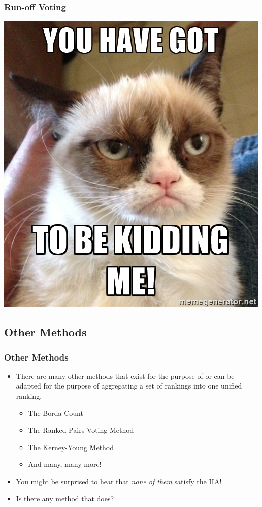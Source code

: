 \documentclass{beamer}
\begin{document}
    \begin{frame}
        \frametitle{Run-off Voting}
    
        \begin{center}
            \includegraphics[width=0.4\linewidth]{got_to_be_kidding_me.jpg}
        \end{center}
    
    \end{frame}
    
    \subsection{Other Methods}
    \begin{frame}
        \frametitle{Other Methods}
    
        \begin{itemize}
            \item There are many other methods that exist for the purpose of or can be adapted for the purpose of aggregating a set of rankings into one unified ranking.
                \begin{itemize}
                    \item The Borda Count
                    \item The Ranked Pairs Voting Method
                    \item The Kerney-Young Method
                    \item And many, many more! 
                \end{itemize} \pause
            \item You might be surprised to hear that \emph{none of them} satisfy the IIA!
            \item Is there any method that does?
        \end{itemize}
    
    \end{frame}
\end{document}
